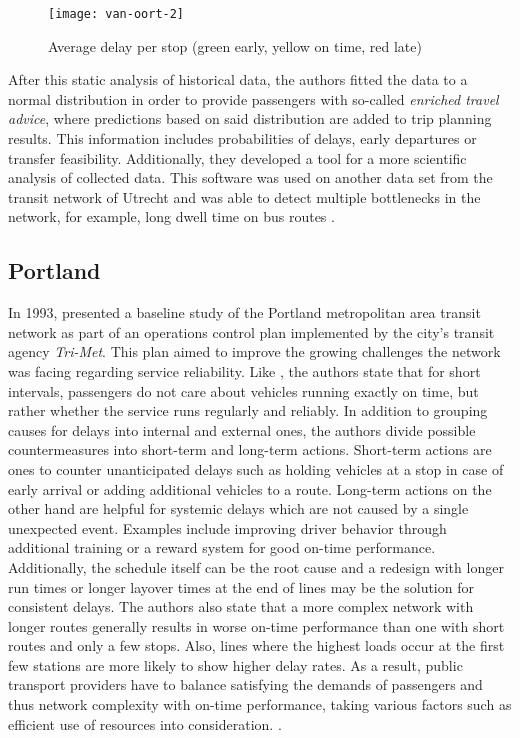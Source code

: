 \begin{figure}[h]
	\centering
	\texttt{[image: van-oort-2]}
	\caption{Average delay per stop (green early, yellow on time, red late) \autocite[379]{van-oort-2015}}
	\label{fig:van-oort-2}
\end{figure}

After this static analysis of historical data, the authors fitted the data to a normal distribution in order to provide passengers with so-called \textit{enriched travel advice}, where predictions based on said distribution are added to trip planning results. This information includes probabilities of delays, early departures or transfer feasibility. Additionally, they developed a tool for a more scientific analysis of collected data. This software was used on another data set from the transit network of Utrecht and was able to detect multiple bottlenecks in the network, for example, long dwell time on bus routes \autocite[380--387]{van-oort-2015}.

\subsection{Portland}

In 1993, \textcite{strathman-1993} presented a baseline study of the Portland metropolitan area transit network as part of an operations control plan implemented by the city's transit agency \textit{Tri-Met}. This plan aimed to improve the growing challenges the network was facing regarding service reliability. Like \textcite{van-oort-2015}, the authors state that for short intervals, passengers do not care about vehicles running exactly on time, but rather whether the service runs regularly and reliably. In addition to grouping causes for delays into internal and external ones, the authors divide possible countermeasures into short-term and long-term actions. Short-term actions are ones to counter unanticipated delays such as holding vehicles at a stop in case of early arrival or adding additional vehicles to a route. Long-term actions on the other hand are helpful for systemic delays which are not caused by a single unexpected event. Examples include improving driver behavior through additional training or a reward system for good on-time performance. Additionally, the schedule itself can be the root cause and a redesign with longer run times or longer layover times at the end of lines may be the solution for consistent delays. The authors also state that a more complex network with longer routes generally results in worse on-time performance than one with short routes and only a few stops. Also, lines where the highest loads occur at the first few stations are more likely to show higher delay rates. As a result, public transport providers have to balance satisfying the demands of passengers and thus network complexity with on-time performance, taking various factors such as efficient use of resources into consideration. \autocite[93--94]{strathman-1993}.

